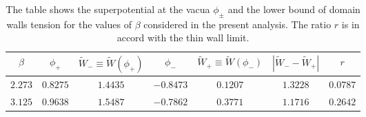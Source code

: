 \documentclass[aps,12pt, a4paper,nofootinbib]{revtex4}
\begin{document}
{\begin{table}[!ht]
\begin{center}
\begin{tabular}{|c|c|c|c|c|c|c|} \hline
$\beta$&$\phi_+$&$\tilde{W}_-\equiv \tilde{W}(\phi_+)$&$\phi_-$&$\tilde{W}_+\equiv \tilde{W}(\phi_-)$&$|\tilde{W}_- -\tilde{W}_+|$&$r$\\ \hline
$2.273$&$0.8275$&$1.4435$&$-0.8473$&$0.1207$&$1.3228$&$0.0787$\\ \hline
$3.125$&$0.9638$&$1.5487$&$-0.7862$&$0.3771$&$1.1716$&$0.2642$\\ \hline
\end{tabular}
\end{center}
\caption{The table shows the superpotential at the vacua $\phi_\pm$ and the lower bound of domain walls tension for the values of $\beta$ considered in the present analysis. The ratio $r$ is in accord with the thin wall limit.}
\label{Tb1}
\end{table}

}
\end{document}

